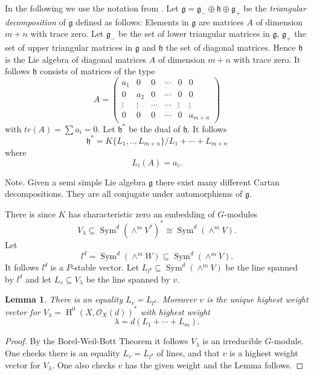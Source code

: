 \documentclass{amsart}
\theoremstyle{plain}
\newtheorem{lemma}[theorem]{Lemma}
\theoremstyle{definition}
\theoremstyle{remark}
\numberwithin{equation}{theorem}
\begin{document}
In the following we use the notation from \cite{fulton}.
Let ${\mathfrak{g}}={\mathfrak{g}}_{-}\oplus {\mathfrak{h}} \oplus {\mathfrak{g}}_{+}$ be the
\emph{triangular decomposition} of ${\mathfrak{g}}$ defined as follows: Elements in ${\mathfrak{g}}$ are matrices
$A$ of dimension $m+n$ with trace zero. Let ${\mathfrak{g}}_-$ be the set of
lower triangular matrices in ${\mathfrak{g}}$, ${\mathfrak{g}}_+$ the set of upper
triangular matrices in ${\mathfrak{g}}$ and ${\mathfrak{h}}$ the set of diagonal
matrices. Hence ${\mathfrak{h}}$ is the Lie algebra of diagonal matrices $A$ of
dimension $m+n$ with trace zero. It follows ${\mathfrak{h}}$ consists of matrices of the
type
\[
A=\begin{pmatrix} a_1 & 0    &  0 & \cdots & 0 & 0 \\
                   0  & a_2  &  0 & \cdots & 0 & 0 \\
                   \vdots &  \vdots & \cdots & \cdots & \vdots & \vdots \\
                  0 & 0 & 0 & \cdots & 0 & a_{m+n}  
\end{pmatrix}
\]
with $tr(A)=\sum a_i=0$. Let ${\mathfrak{h}}^*$ be the dual of ${\mathfrak{h}}$. It follows
\[ {\mathfrak{h}}^*=K\{L_1,..,L_{m+n}\}/L_1+\cdots +L_{m+n} \]
where
\[ L_i(A)=a_i.\]

Note. Given a semi simple Lie algebra ${\mathfrak{g}}$ there exist many different
Cartan decompositions. They are all conjugate under automorphisms of ${\mathfrak{g}}$.

There is since $K$ has characteristic zero an embedding of
$G$-modules
\[ {V_\lambda}\subseteq {\operatorname{Sym} }^d(\wedge^mV^*)^*\cong {\operatorname{Sym} }^d(\wedge^m V) .\]
Let 
\[ l^d={\operatorname{Sym} }^d(\wedge^mW)\subseteq {\operatorname{Sym} }^d(\wedge^m V).\]
It follows $l^d$ is a $P$-stable vector. Let $L_{l^d}\subseteq
{\operatorname{Sym} }^d(\wedge^m V)$ be the line spanned by $l^d$ and let $L_v\subseteq
{V_\lambda}$ be the line spanned by $v$.

\begin{lemma} \label{stable}There is an equality $L_v=L_{l^d}$. Moreover $v$ is the
 unique  highest weight vector for ${V_\lambda}={\operatorname{H} }^0(X,{\mathcal{O} }_X(d))^*$ with highest weight
\[ \lambda=d(L_1+\cdots +L_m).\]
\end{lemma}
\begin{proof} By the Borel-Weil-Bott Theorem it follows ${V_\lambda}$ is an
  irreducible $G$-module. One checks there is an equality
  $L_v=L_{l^d}$ of lines, and that $v$ is a highest weight vector for ${V_\lambda}$. 
One also checks $v$ has the given weight and the Lemma follows.
\end{proof}
\end{document}
